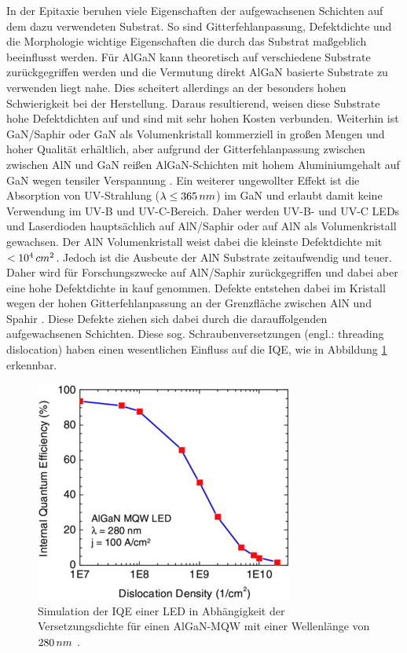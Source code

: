 In der Epitaxie beruhen viele Eigenschaften der aufgewachsenen Schichten auf dem dazu verwendeten Substrat. So sind Gitterfehlanpassung, Defektdichte und die Morphologie wichtige Eigenschaften die durch das Substrat maßgeblich beeinflusst werden. Für AlGaN kann theoretisch auf verschiedene Substrate zurückgegriffen werden und die Vermutung direkt AlGaN basierte Substrate zu verwenden liegt nahe. Dies scheitert allerdings an der besonders hohen Schwierigkeit bei der Herstellung. Daraus resultierend, weisen diese Substrate hohe Defektdichten auf und sind mit sehr hohen Kosten verbunden. Weiterhin ist GaN/Saphir oder GaN als Volumenkristall kommerziell in großen Mengen und hoher Qualität erhältlich, aber aufgrund der Gitterfehlanpassung zwischen zwischen AlN und GaN reißen AlGaN-Schichten mit hohem Aluminiumgehalt auf GaN wegen tensiler Verspannung \cite{problem} . Ein weiterer ungewollter Effekt ist die Absorption von UV-Strahlung ($\lambda \leq 365 \thinspace nm$) im GaN und erlaubt damit keine Verwendung im UV-B und UV-C-Bereich. Daher werden UV-B- und UV-C LEDs und Laserdioden hauptsächlich auf AlN/Saphir oder auf AlN als Volumenkristall gewachsen. Der AlN Volumenkristall weist dabei die kleinste Defektdichte mit $<10^4 \thinspace cm^2$. Jedoch ist die Ausbeute der AlN Substrate zeitaufwendig und teuer. Daher wird für Forschungszwecke auf AlN/Saphir zurückgegriffen und dabei aber eine hohe Defektdichte in kauf genommen. Defekte entstehen dabei im Kristall wegen der hohen Gitterfehlanpassung an der Grenzfläche zwischen AlN und Spahir \cite{pohl}. Diese Defekte ziehen sich dabei durch die darauffolgenden aufgewachsenen Schichten. Diese sog. Schraubenversetzungen (engl.: threading dislocation) haben einen wesentlichen Einfluss auf die IQE, wie in Abbildung \ref{fig:IQEthreadingdisl} erkennbar. 
%
\begin{figure}[h]
\centering
\begin{minipage}[t]{1\linewidth}
\centering
\includegraphics[width=0.5\linewidth]{Bilder/IQEthreadingdisl.png}
\end{minipage}%
\caption{Simulation der IQE einer LED in Abhängigkeit der Versetzungsdichte für einen AlGaN-MQW mit einer Wellenlänge von $280 \thinspace nm$ \cite{0268-1242-26-1-014036}.}
 \label{fig:IQEthreadingdisl}
\end{figure}
